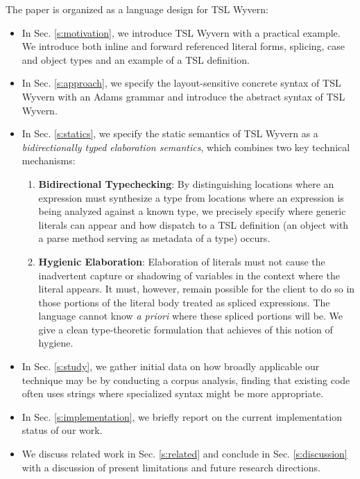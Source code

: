 The paper is organized as a language design for TSL Wyvern:
\begin{itemize}
\item In Sec. \ref{s:motivation}, we introduce TSL Wyvern with a practical example. We introduce  both inline and forward referenced literal forms, splicing, case and object types and an example of a TSL definition.
\item In Sec. \ref{s:approach}, we specify the layout-sensitive concrete syntax of TSL Wyvern with an Adams grammar and introduce the abstract syntax of TSL Wyvern.
\item In Sec. \ref{s:statics}, we specify the static semantics of TSL Wyvern as a \emph{bidirectionally typed elaboration semantics}, which combines two key technical mechanisms: 
\begin{enumerate}
\item \textbf{Bidirectional Typechecking}: By distinguishing locations where an expression must synthesize a type from locations where an expression is being analyzed against a known type, we precisely specify where generic literals can appear and how dispatch to a TSL definition (an object with a parse method serving as metadata of a type) occurs.
\item \textbf{Hygienic Elaboration}: Elaboration of literals must not cause the inadvertent capture or shadowing of variables in the context where the literal appears. It must, however, remain possible for the client to do so in those portions of the literal body treated as spliced expressions. The language cannot know \emph{a priori} where these spliced portions will be. We give a clean type-theoretic formulation that achieves of this notion of hygiene.
\end{enumerate}
\item In Sec. \ref{s:study}, we gather initial data on how broadly applicable our technique may be by conducting a corpus analysis, finding that existing code often uses strings where specialized syntax might be more appropriate.
\item In Sec. \ref{s:implementation}, we briefly report on the current implementation status of our work. 
\item We discuss related work in Sec. \ref{s:related} and conclude in Sec. \ref{s:discussion} with a discussion of present limitations and future research directions.
\end{itemize}


